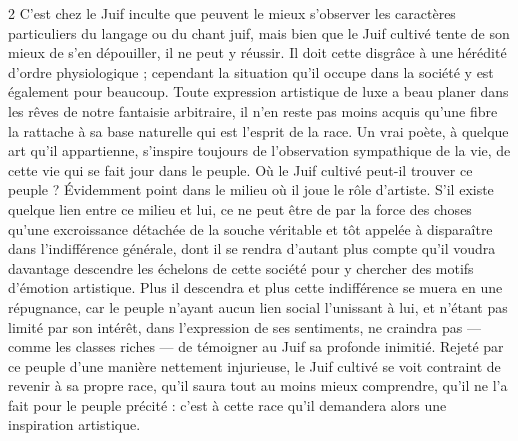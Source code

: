 \documentclass[a4paper,12pt]{article}
\begin{document}
\begin{paracol}{2}
         {C’est chez le Juif inculte que peuvent le mieux s’observer les caractères particuliers du langage ou du chant juif, mais bien que le Juif cultivé tente de son mieux de s’en dépouiller, il ne peut y réussir. Il doit cette disgrâce à une hérédité d’ordre physiologique ; cependant la situation qu’il occupe dans la société y est également pour beaucoup. Toute expression artistique de luxe a beau planer dans les rêves de notre fantaisie arbitraire, il n’en reste pas moins acquis qu’une fibre la rattache à sa base naturelle qui est l’esprit de la race. Un vrai poète, à quelque art qu’il appartienne, s’inspire toujours de l’observation sympathique de la vie, de cette vie qui se fait jour dans le peuple. Où le Juif cultivé peut-il trouver ce peuple ? Évidemment point dans le milieu où il joue le rôle d’artiste. S’il existe quelque lien entre ce milieu et lui, ce ne peut être de par la force des choses qu’une excroissance détachée de la souche véritable et tôt appelée à disparaître dans l’indifférence générale, dont il se rendra d’autant plus compte qu’il voudra davantage descendre les échelons de cette société pour y chercher des motifs d’émotion artistique. Plus il descendra et plus cette indifférence se muera en une répugnance, car le peuple n’ayant aucun lien social l’unissant à lui, et n’étant pas limité par son intérêt, dans l’expression de ses sentiments, ne craindra pas --- comme les classes riches --- de témoigner au Juif sa profonde inimitié. Rejeté par ce peuple d’une manière nettement injurieuse, le Juif cultivé se voit contraint de revenir à sa propre race, qu’il saura tout au moins mieux comprendre, qu’il ne l’a fait pour le peuple précité : c’est à cette race qu’il demandera alors une inspiration artistique.}

\end{paracol}
\end{document}
